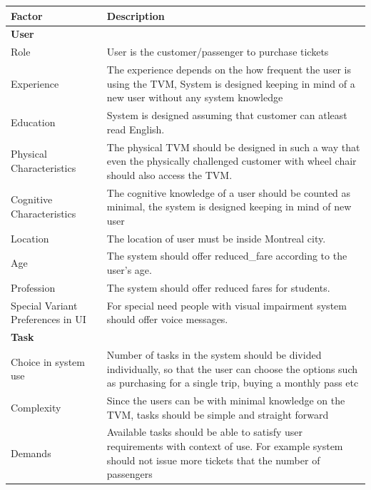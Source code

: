 \documentclass[a4paper,12pt]{report}
\begin{document}
\setlength{\tabcolsep}{18pt}
\renewcommand{\arraystretch}{1.5}
\begin{tabular}[H]{ |p{3cm}|p{12cm}| }
	\hline
	\textbf{Factor}  & \textbf{Description}  \\
	\hline
	\textbf{User} &   \\
	\hline
	Role &
	User is the customer/passenger to purchase tickets
	\\
	\hline
	Experience & 
	The experience depends on the how frequent the user is using the TVM, System is designed keeping in mind of a new user without any system knowledge
	\\
	\hline
	Education &
	System is designed assuming that customer can atleast read English.
	\\
	\hline
	Physical Characteristics    &
	The physical TVM should be designed in such a way that even the physically challenged customer with wheel chair should also access the TVM.
	\\
	\hline
	Cognitive Characteristics & 
	The cognitive knowledge of a user should be counted as minimal, the system is designed keeping in mind of new user
	\\
	\hline
	Location & 
	The location of user must be inside Montreal city.
	\\
	\hline
	Age & 
	The system should offer \gls{reduced_fare} according to the user's age.
	\\
	\hline
	Profession & 
	The system should offer reduced fares for students.
	\\
	\hline
	Special Variant Preferences in UI & 
	For special need people with visual impairment system should offer voice messages.
	\\
	\hline
	\textbf{Task} &  \\
	\hline
	Choice in system use &
	Number of tasks in the system should be divided individually, so that the user can choose the options such as purchasing for a single trip, buying a monthly pass etc
	\\
	\hline
	Complexity & 
	Since the users can be with minimal knowledge on the TVM, tasks should be simple and straight forward
	\\
	\hline
	Demands &
	Available tasks should be able to satisfy user requirements with context of use. For example system should not issue more tickets that the number of passengers 
	\\
	\hline 
\end{tabular}
\end{document}
